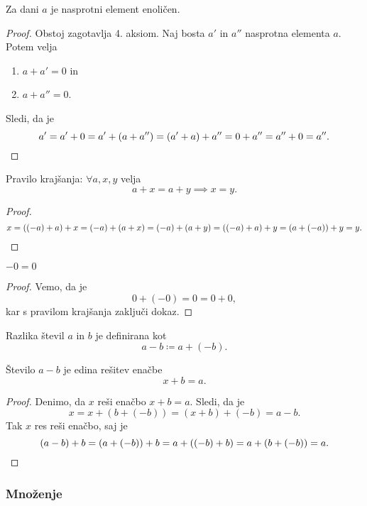 \documentclass[12pt, a4paper]{article}
\begin{document}
\begin{opomba}\label{o1}
Za dani $a$ je nasprotni element enoličen.
\end{opomba}

\begin{proof}
Obstoj zagotavlja 4. aksiom. Naj bosta $a'$ in $a''$ nasprotna elementa $a$. Potem velja

\begin{enumerate}[label=(\roman*)]
\item $a+a'=0$ in
\item $a+a''=0$.
\end{enumerate}

Sledi, da je
\[
a'=a'+0=a'+(a+a'')=(a'+a)+a''=0+a''=a''+0=a''.\qedhere
\]
\end{proof}

\begin{opomba}\label{o2}
Pravilo krajšanja: $\forall a,x,y$ velja
\[
a+x=a+y\implies x=y.
\]
\end{opomba}

\begin{proof}
\[
x=((-a)+a)+x=(-a)+(a+x)=(-a)+(a+y)=((-a)+a)+y=(a+(-a))+y=y.\qedhere
\]
\end{proof}

\begin{posledica}
$-0=0$
\end{posledica}

\begin{proof}
Vemo, da je
\[
0+(-0)=0=0+0,
\]
kar s pravilom krajšanja zaključi dokaz.
\end{proof}

\begin{definicija}
Razlika števil $a$ in $b$ je definirana kot
\[
a-b\coloneqq a+(-b).
\]
\end{definicija}

\begin{posledica}\label{p1}
Število $a-b$ je edina rešitev enačbe
\[
x+b=a.
\]
\end{posledica}

\begin{proof}
Denimo, da $x$ reši enačbo $x+b=a$. Sledi, da je
\[
x=x+(b+(-b))=(x+b)+(-b)=a-b.
\]
Tak $x$ res reši enačbo, saj je
\[
(a-b)+b=(a+(-b))+b=a+((-b)+b)=a+(b+(-b))=a.\qedhere
\]
\end{proof}

\newpage

\subsubsection{Množenje}
\end{document}

